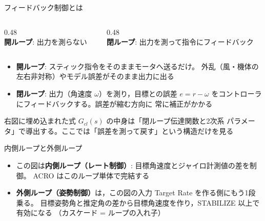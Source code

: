 \begin{frame}{フィードバック制御とは}
  \begin{columns}[c]
    \begin{column}{0.48\textwidth}
      \centering
      \\
      {\footnotesize\textbf{開ループ}: 出力を測らない}
    \end{column}
    \begin{column}{0.48\textwidth}
      \centering
      \\
      {\footnotesize\textbf{閉ループ}: 出力を測って指令にフィードバック}
    \end{column}
  \end{columns}

  \vspace{0.3em}

  \begin{itemize}\footnotesize
    \item \textbf{開ループ}: スティック指令をそのままモータへ送るだけ。
          外乱（風・機体の左右非対称）やモデル誤差がそのまま出力に出る
    \item \textbf{閉ループ}: 出力（角速度 $\omega$）を測り，目標との誤差
          $e=r-\omega$ をコントローラにフィードバックする。誤差が縮む方向に
          常に補正がかかる
  \end{itemize}

  {\scriptsize 右図に埋め込まれた式 $G_{cl}(s)$ の中身は「閉ループ伝達関数と2次系
  パラメータ」で導出する。ここでは「誤差を測って戻す」という構造だけを見る}
\end{frame}

\begin{frame}{内側ループと外側ループ}
  \begin{center}
  \end{center}

  \vspace{0.5em}

  \begin{itemize}\footnotesize
    \item この図は\textbf{内側ループ（レート制御）}: 目標角速度とジャイロ計測値の差を制御。
          ACRO はこのループ単体で完結する
    \item \textbf{外側ループ（姿勢制御）}は，この図の入力 Target Rate を作る側にもう1段乗る。
          目標姿勢角と推定角の差から目標角速度を作り，STABILIZE 以上で有効になる
          （カスケード = ループの入れ子）
  \end{itemize}
\end{frame}

